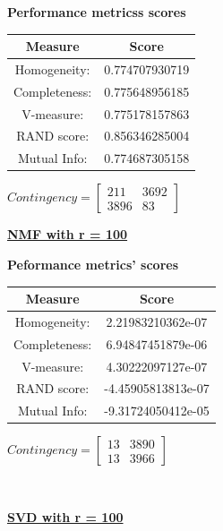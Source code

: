 \documentclass{report}
\begin{document}
\begin{center}
	\textbf{Performance metricss scores} \\ \vspace{10pt}	
	\begin{tabular}{*{2}{c}}
		\toprule
		\textbf{Measure} & \textbf{Score} \\
		\midrule		
		Homogeneity: & 0.774707930719  \\
		\midrule
		Completeness: & 0.775648956185 \\
		\midrule
		V-measure: & 0.775178157863 \\
		\midrule
		RAND score: & 0.856346285004 \\
		\midrule
		Mutual Info: & 0.774687305158 \\
		\bottomrule
	\end{tabular}
	\qquad
	$Contingency = \left[\begin{array}{*{2}{c}}
		211  & 3692 \\
		3896 & 83
			\end{array}\right]
		$
\end{center}
\newpage

\underline{\textbf{NMF with r = 100}} 

\begin{center}
	\textbf{Peformance metrics' scores} \\ \vspace{10pt}	
	\begin{tabular}{*{2}{c}}
		\toprule
		\textbf{Measure} & \textbf{Score} \\
		\midrule
		Homogeneity: & 2.21983210362e-07 \\
		\midrule
		Completeness: & 6.94847451879e-06 \\
		\midrule
		V-measure: & 4.30222097127e-07 \\
		\midrule
		RAND score: & -4.45905813813e-07 \\
		\midrule
		Mutual Info: & -9.31724050412e-05  \\
		\bottomrule
	\end{tabular}
	\qquad	
	$Contingency = \left[\begin{array}{*{2}{c}}
		13 	& 3890 \\
		13 	& 3966 
			\end{array} \right]
		$
\end{center}
\\ \vspace{20pt}

\underline{\textbf{SVD with r = 100}} 
\end{document}
